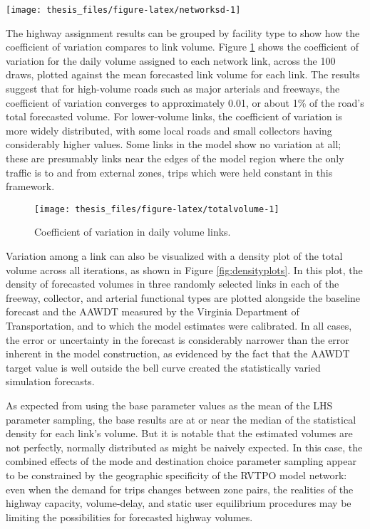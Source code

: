 \documentclass[fancy, masters,twoside]{byuthesis}
\begin{document}
\begin{sidewaysfigure}

{\centering \texttt{[image: thesis\_files/figure-latex/networksd-1]} 

}

\caption{Standard deviation in forecasted volume.}\label{fig:networksd}
\end{sidewaysfigure}

The highway assignment results can be grouped by facility type to show how the coefficient of variation compares to link volume. Figure \ref{fig:totalvolume} shows the coefficient of variation for the daily volume assigned to each network link, across the 100 draws, plotted against the mean forecasted link volume for each link. The results suggest that for high-volume roads such as major arterials and freeways, the coefficient of variation converges to approximately 0.01, or about 1\% of the road's total forecasted volume. For lower-volume links, the coefficient of variation is more widely distributed, with some local roads and small collectors having considerably higher values. Some links in the model show no variation at all; these are presumably links near the edges of the model region where the only traffic is to and from external zones, trips which were held constant in this framework.

\begin{figure}

{\centering \texttt{[image: thesis\_files/figure-latex/totalvolume-1]} 

}

\caption{Coefficient of variation in daily volume links.}\label{fig:totalvolume}
\end{figure}

Variation among a link can also be visualized with a density plot of the total volume across all iterations, as shown in Figure \ref{fig:densityplots}. In this plot, the density of forecasted volumes in three randomly selected links in each of the freeway, collector, and arterial functional types are plotted alongside the baseline forecast and the AAWDT measured by the Virginia Department of Transportation, and to which the model estimates were calibrated. In all cases, the error or uncertainty in the forecast is considerably narrower than the error inherent in the model construction, as evidenced by the fact that the AAWDT target value is well outside the bell curve created the statistically varied simulation forecasts.

As expected from using the base parameter values as the mean of the LHS parameter sampling, the base results are at or near the median of the statistical density for each link's volume. But it is notable that the estimated volumes are not perfectly, normally distributed as might be naively expected. In this case, the combined effects of the mode and destination choice parameter sampling appear to be constrained by the geographic specificity of the RVTPO model network: even when the demand for trips changes between zone pairs, the realities of the highway capacity, volume-delay, and static user equilibrium procedures may be limiting the possibilities for forecasted highway volumes.
\end{document}
